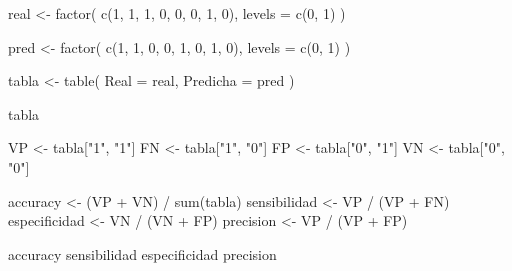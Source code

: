 \documentclass[
  spanish,
  11pt,
  letterpaper,
  DIV=11,
  numbers=noendperiod]{scrreprt}
\newenvironment{Shaded}{\begin{snugshade}}{\end{snugshade}}
\newcommand{\AttributeTok}[1]{\textcolor[rgb]{0.40,0.45,0.13}{#1}}
\newcommand{\DecValTok}[1]{\textcolor[rgb]{0.68,0.00,0.00}{#1}}
\newcommand{\FunctionTok}[1]{\textcolor[rgb]{0.28,0.35,0.67}{#1}}
\newcommand{\NormalTok}[1]{\textcolor[rgb]{0.00,0.23,0.31}{#1}}
\newcommand{\OtherTok}[1]{\textcolor[rgb]{0.00,0.23,0.31}{#1}}
\newcommand{\SpecialCharTok}[1]{\textcolor[rgb]{0.37,0.37,0.37}{#1}}
\newcommand{\StringTok}[1]{\textcolor[rgb]{0.13,0.47,0.30}{#1}}
\theoremstyle{definition}
\theoremstyle{plain}
\theoremstyle{definition}
\theoremstyle{remark}
\begin{document}
\begin{Shaded}
\begin{Highlighting}[]
\NormalTok{real }\OtherTok{\textless{}{-}} \FunctionTok{factor}\NormalTok{(}
  \FunctionTok{c}\NormalTok{(}\DecValTok{1}\NormalTok{, }\DecValTok{1}\NormalTok{, }\DecValTok{1}\NormalTok{, }\DecValTok{0}\NormalTok{, }\DecValTok{0}\NormalTok{, }\DecValTok{0}\NormalTok{, }\DecValTok{1}\NormalTok{, }\DecValTok{0}\NormalTok{),}
  \AttributeTok{levels =} \FunctionTok{c}\NormalTok{(}\DecValTok{0}\NormalTok{, }\DecValTok{1}\NormalTok{)}
\NormalTok{)}

\NormalTok{pred }\OtherTok{\textless{}{-}} \FunctionTok{factor}\NormalTok{(}
  \FunctionTok{c}\NormalTok{(}\DecValTok{1}\NormalTok{, }\DecValTok{1}\NormalTok{, }\DecValTok{0}\NormalTok{, }\DecValTok{0}\NormalTok{, }\DecValTok{1}\NormalTok{, }\DecValTok{0}\NormalTok{, }\DecValTok{1}\NormalTok{, }\DecValTok{0}\NormalTok{),}
  \AttributeTok{levels =} \FunctionTok{c}\NormalTok{(}\DecValTok{0}\NormalTok{, }\DecValTok{1}\NormalTok{)}
\NormalTok{)}

\NormalTok{tabla }\OtherTok{\textless{}{-}} \FunctionTok{table}\NormalTok{(}
  \AttributeTok{Real =}\NormalTok{ real,}
  \AttributeTok{Predicha =}\NormalTok{ pred}
\NormalTok{)}

\NormalTok{tabla}

\NormalTok{VP }\OtherTok{\textless{}{-}}\NormalTok{ tabla[}\StringTok{"1"}\NormalTok{, }\StringTok{"1"}\NormalTok{]}
\NormalTok{FN }\OtherTok{\textless{}{-}}\NormalTok{ tabla[}\StringTok{"1"}\NormalTok{, }\StringTok{"0"}\NormalTok{]}
\NormalTok{FP }\OtherTok{\textless{}{-}}\NormalTok{ tabla[}\StringTok{"0"}\NormalTok{, }\StringTok{"1"}\NormalTok{]}
\NormalTok{VN }\OtherTok{\textless{}{-}}\NormalTok{ tabla[}\StringTok{"0"}\NormalTok{, }\StringTok{"0"}\NormalTok{]}

\NormalTok{accuracy }\OtherTok{\textless{}{-}}\NormalTok{ (VP }\SpecialCharTok{+}\NormalTok{ VN) }\SpecialCharTok{/} \FunctionTok{sum}\NormalTok{(tabla)}
\NormalTok{sensibilidad }\OtherTok{\textless{}{-}}\NormalTok{ VP }\SpecialCharTok{/}\NormalTok{ (VP }\SpecialCharTok{+}\NormalTok{ FN)}
\NormalTok{especificidad }\OtherTok{\textless{}{-}}\NormalTok{ VN }\SpecialCharTok{/}\NormalTok{ (VN }\SpecialCharTok{+}\NormalTok{ FP)}
\NormalTok{precision }\OtherTok{\textless{}{-}}\NormalTok{ VP }\SpecialCharTok{/}\NormalTok{ (VP }\SpecialCharTok{+}\NormalTok{ FP)}

\NormalTok{accuracy}
\NormalTok{sensibilidad}
\NormalTok{especificidad}
\NormalTok{precision}
\end{Highlighting}
\end{Shaded}
\end{document}
